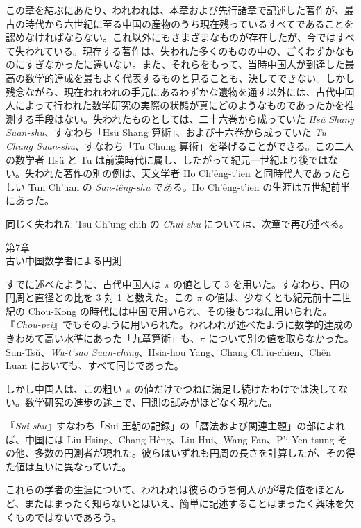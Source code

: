 \documentclass[11pt]{article}
\newcommand{\scanpage}[2]{\clearpage\setcounter{footnote}{0}\noindent{\footnotesize\color{gray}PDF #1 頁 · #2}\par\medskip}
\newcommand{\scanfooter}{}
\begin{document}
この章を結ぶにあたり、われわれは、本章および先行諸章で記述した著作が、最古の時代から六世紀に至る中国の産物のうち現在残っているすべてであることを認めなければならない。これ以外にもさまざまなものが存在したが、今ではすべて失われている。現存する著作は、失われた多くのものの中の、ごくわずかなものにすぎなかったに違いない。また、それらをもって、当時中国人が到達した最高の数学的達成を最もよく代表するものと見ることも、決してできない。しかし残念ながら、現在われわれの手元にあるわずかな遺物を通す以外には、古代中国人によって行われた数学研究の実際の状態が真にどのようなものであったかを推測する手段はない。失われたものとしては、二十六巻から成っていた \emph{Hsü Shang Suan-shu}、すなわち「Hsü Shang 算術」、および十六巻から成っていた \emph{Tu Chung Suan-shu}、すなわち「Tu Chung 算術」を挙げることができる。この二人の数学者 Hsü と Tu は前漢時代に属し、したがって紀元一世紀より後ではない。失われた著作の別の例は、天文学者 Ho Ch'êng-t'ien と同時代人であったらしい Tun Ch'üan の \emph{San-têng-shu} である。Ho Ch'êng-t'ien の生涯は五世紀前半にあった。

同じく失われた Tsu Ch'ung-chih の \emph{Chui-shu} については、次章で再び述べる。
\scanfooter


\scanpage{0060}{第7章、印刷頁46}
\setcounter{footnote}{0}
\begin{center}
第7章\\
古い中国数学者による円測
\end{center}

すでに述べたように、古代中国人は $\pi$ の値として 3 を用いた。すなわち、円の円周と直径との比を 3 対 1 と数えた。この $\pi$ の値は、少なくとも紀元前十二世紀の Chou-Kong の時代には中国で用いられ、その後もつねに用いられた。『\emph{Chou-pei}』でもそのように用いられた。われわれが述べたように数学的達成のきわめて高い水準にあった「九章算術」も、$\pi$ について別の値を取らなかった。Sun-Tsŭ、\emph{Wu-t'sao Suan-ching}、Hsia-hou Yang、Chang Ch'iu-chien、Chên Luan においても、すべて同じであった。

しかし中国人は、この粗い $\pi$ の値だけでつねに満足し続けたわけでは決してない。数学研究の進歩の途上で、円測の試みがほどなく現れた。

『\emph{Sui-shu}』すなわち「Sui 王朝の記録」の「暦法および関連主題」の部によれば、中国には Liu Hsing、Chang Hêng、Liu Hui、Wang Fan、P'i Yen-tsung その他、多数の円測者が現れた。彼らはいずれも円周の長さを計算したが、その得た値は互いに異なっていた。

これらの学者の生涯について、われわれは彼らのうち何人かが得た値をほとんど、またはまったく知らないとはいえ、簡単に記述することはまったく興味を欠くものではないであろう。
\end{document}
